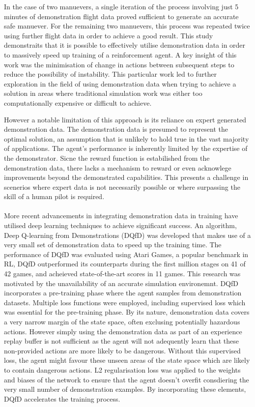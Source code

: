 In the case of two manuevers, a single iteration of the process involving just 5 minutes of demonstration flight data proved sufficient to generate an accurate safe manuever.
For the remaining two manuevers, this process was repeated twice using further flight data in order to achieve a good result.
This study demonstraits that it is possible to effectively utilise demonstration data in order to massively speed up training of a reinforcement agent.
A key insight of this work was the minimisation of change in actions between subsequent steps to reduce the possibility of instability.
This particular work led to further exploration in the field of using demonstration data when trying to achieve a solution in areas where traditional simulation work was either too computationally expensive or difficult to achieve.

However a notable limitation of this approach is its reliance on expert generated demonstration data.
The demonstration data is presumed to represent the optimal solution, an assumption that is unlikely to hold true in the vast majority of applications.
The agent's performance is inherently limited by the expertise of the demonstrator.
Sicne the reward function is estabilished from the demonstration data, there lacks a mechanism to reward or even acknowlege improvements beyond the demonstrated capabilities.
This presents a challenge in scenerios where expert data is not necessarily possible or where surpassing the skill of a human pilot is required. \\\\


More recent advancements in integrating demonstration data in training have utilised deep learning techniques to achieve significant success\cite{deepQLearningFromDemo}.
An algorithm, Deep Q-learning from Demonstrations (DQfD) was developed that makes use of a very small set of demonstration data to speed up the training time.
The performance of DQfD was evaluated using Atari Games, a popular benchmark in RL, DQfD outperformed its counterparts during the first million stages on 41 of 42 games, and acheieved state-of-the-art scores in 11 games.
This research was motivated by the unavailability of an accurate simulation environemnt.
DQfD incorporates a pre-training phase where the agent samples from demonstration datasets.
Multiple loss functions were employed, including supervised loss which was essential for the pre-training phase.
By its nature, demonstration data covers a very narrow margin of the state space, often exclusing potentially hazardous actions.
However simply using the demonstration data as part of an experience replay buffer is not sufficient as the agent will not adequently learn that these non-provided actions are more likely to be dangerous.
Without this supervised loss, the agent might favour these unseen areas of the state space which are likely to contain dangerous actions.
L2 regularisation loss was applied to the weights and biases of the network to ensure that the agent doesn't overfit consdiering the very small number of demonstration examples.
By incorporating these elements, DQfD accelerates the training process.


